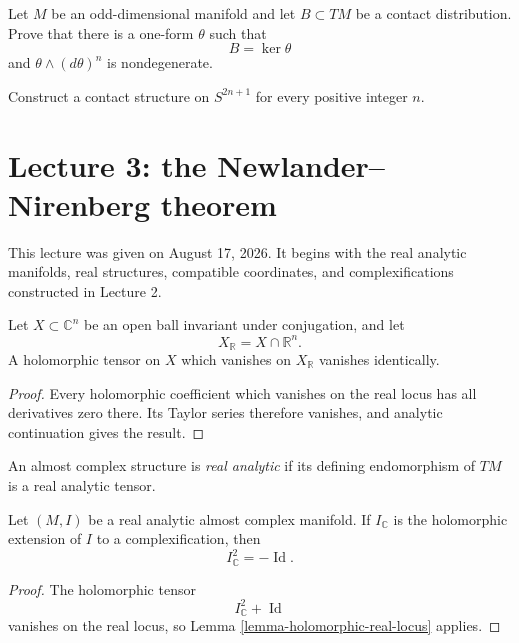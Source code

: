 \begin{exercise}
\label{exercise-contact-defining-form}
Let $M$ be an odd-dimensional manifold and
let $B\subset TM$ be a contact distribution.
Prove that there is a one-form $\theta$ such
that
$$
B=\ker\theta
$$
and $\theta\wedge(d\theta)^n$ is
nondegenerate.
\end{exercise}

\begin{exercise}
\label{exercise-contact-sphere}
Construct a contact structure on
$S^{2n+1}$ for every positive integer $n$.
\end{exercise}

\section{Lecture 3: the
Newlander--Nirenberg theorem}
\label{section-lecture-three-newlander}

\noindent
This lecture was given on August 17, 2026.
It begins with the real analytic manifolds,
real structures, compatible coordinates,
and complexifications constructed in
Lecture 2.

\begin{lemma}
\label{lemma-holomorphic-real-locus}
Let $X\subset\mathbb{C}^n$ be an open ball
invariant under conjugation, and let
$$
X_{\mathbb{R}}=X\cap\mathbb{R}^n.
$$
A holomorphic tensor on $X$ which vanishes
on $X_{\mathbb{R}}$ vanishes identically.
\end{lemma}

\begin{proof}
Every holomorphic coefficient which vanishes
on the real locus has all derivatives zero
there. Its Taylor series therefore vanishes,
and analytic continuation gives the result.
\end{proof}

\begin{definition}
\label{definition-real-analytic-ac}
An almost complex structure is
{\it real analytic} if its defining
endomorphism of $TM$ is a real analytic
tensor.
\end{definition}

\begin{corollary}
\label{lemma-complexified-ac-square}
Let $(M,I)$ be a real analytic almost
complex manifold. If $I_{\mathbb{C}}$ is
the holomorphic extension of $I$ to a
complexification, then
$$
I_{\mathbb{C}}^2
=-\operatorname{Id}.
$$
\end{corollary}

\begin{proof}
The holomorphic tensor
$$
I_{\mathbb{C}}^2+
\operatorname{Id}
$$
vanishes on the real locus, so Lemma
\ref{lemma-holomorphic-real-locus} applies.
\end{proof}


